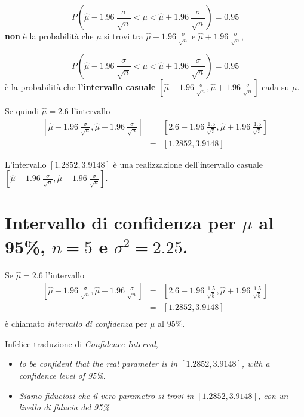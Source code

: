 \documentclass[
  11pt,
]{book}
\providecommand{\tightlist}{%
  \setlength{\itemsep}{0pt}\setlength{\parskip}{0pt}}
\theoremstyle{mytheoremstyle}
\theoremstyle{mydefstyle}
\newenvironment{att}
  {
\begin{tcolorbox}[enhanced,arc=0.1mm,boxrule=1pt,colback=white,colframe=ared,title=\bf\small \fontfamily{lmss}\selectfont \faExclamationTriangle \hspace{.5 cm} Attenzione,drop fuzzy shadow]
}{
\end{tcolorbox}
  }
\newenvironment{nota}
  {
\begin{tcolorbox}[enhanced,breakable,arc=0.1mm,boxrule=1pt,colback=white,colframe=iblue,title=\bf \fontfamily{lmss}\selectfont \faInfoCircle \hspace{.5 cm} Nota,drop fuzzy shadow]
}{
\end{tcolorbox}
  }
\begin{document}
\begin{att}
\[  P\left(\hat \mu- 1.96~\frac\sigma{\sqrt n}<\mu<\hat \mu+1.96~\frac\sigma{\sqrt n}\right) = 0.95\]
\textbf{non} è la probabilità che \(\mu\) si trovi tra \(\hat \mu- 1.96~\frac\sigma{\sqrt n}\) e \(\hat \mu+ 1.96~\frac\sigma{\sqrt n}\),

\[  P\left(\hat \mu- 1.96~\frac\sigma{\sqrt n}<\mu<\hat \mu+1.96~\frac\sigma{\sqrt n}\right) = 0.95\]
è la probabilità che \textbf{l'intervallo casuale} \(\left[\hat \mu- 1.96~\frac\sigma{\sqrt n},\hat \mu+ 1.96~\frac\sigma{\sqrt n}\right]\) cada su \(\mu\).

\end{att}

Se quindi \(\hat \mu = 2.6\) l'intervallo
\begin{eqnarray*}
 \left[\hat \mu- 1.96~\frac\sigma{\sqrt n},\hat \mu+ 1.96~\frac\sigma{\sqrt n}\right] &=& 
\left[2.6- 1.96~\frac{1.5}{\sqrt 5},\hat \mu+ 1.96~\frac{1.5}{\sqrt 5}\right]\\
 &=& \left[1.2852,3.9148\right]
\end{eqnarray*}

L'intervallo \(\left[1.2852,3.9148\right]\) è una realizzazione dell'intervallo casuale \(\left[\hat \mu- 1.96~\frac\sigma{\sqrt n},\hat \mu+ 1.96~\frac\sigma{\sqrt n}\right]\).

\section{\texorpdfstring{Intervallo di confidenza per \(\mu\) al 95\%, \(n=5\) e \(\sigma^2=2.25\).}{Intervallo di confidenza per \textbackslash mu al 95\%, n=5 e \textbackslash sigma\^{}2=2.25.}}\label{intervallo-di-confidenza-per-mu-al-95-n5-e-sigma22.25.}

Se \(\hat \mu = 2.6\) l'intervallo
\begin{eqnarray*}
 \left[\hat \mu- 1.96~\frac\sigma{\sqrt n},\hat \mu+ 1.96~\frac\sigma{\sqrt n}\right] &=& 
\left[2.6- 1.96~\frac{1.5}{\sqrt 5},\hat \mu+ 1.96~\frac{1.5}{\sqrt 5}\right]\\
 &=& \left[1.2852,3.9148\right]\\
\end{eqnarray*}
è chiamato \emph{intervallo di confidenza} per \(\mu\) al 95\%.

\begin{nota}

Infelice traduzione di \emph{Confidence Interval},

\begin{itemize}
\tightlist
\item
  \emph{to be confident that the real parameter is in \(\left[1.2852,3.9148\right]\), with a confidence level of 95\%}.
\item
  \emph{Siamo fiduciosi che il vero parametro si trovi in \(\left[1.2852,3.9148\right]\), con un livello di fiducia del 95\%}
\end{itemize}

\end{nota}
\end{document}
